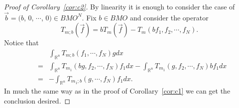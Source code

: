 \documentclass[11pt,oneside,onecolumn]{amsart}
\numberwithin{equation}{section}
\begin{document}
\begin{proof}[Proof of Corollary~\ref{cor:c2}]
By linearity it is enough to consider the case of $\vec{b}=(b$, $0$, $\cdots$, $0)\in BMO^N$. Fix $b\in BMO$ and consider the
operator
\[
  T_{m;b}(\vec{f})=bT_m(\vec{f})-T_m(bf_1,f_2,\cdots,f_N).
\]
Notice that
\begin{eqnarray*}
&&\int_{{\mathbb{R}}^n}T_{m;b}(f_1,\cdots,f_N)gdx \\
&=&
\int_{{\mathbb{R}}^n}T_{m_1}(bg,f_2,\cdots,f_N)f_1dx-\int_{{\mathbb{R}}^n}T_{m_1}(g,f_2,\cdots,f_N)b f_1dx\\
&=& -\int_{{\mathbb{R}}^n}T_{m_1;b}(g,\cdots,f_N)f_1dx.
\end{eqnarray*}
In much the same way as  in the proof of Corollary~\ref{cor:c1} we can get the conclusion desired.
\end{proof}
\end{document}
